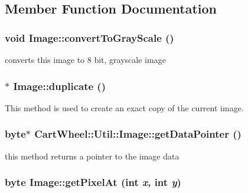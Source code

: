 \subsection{Member Function Documentation}
\hypertarget{classCartWheel_1_1Util_1_1Image_af17078f59a3a9f221ea0335d175a75c2}{
\subsubsection[{convertToGrayScale}]{\setlength{\rightskip}{0pt plus 5cm}void Image::convertToGrayScale ()}}
\label{classCartWheel_1_1Util_1_1Image_af17078f59a3a9f221ea0335d175a75c2}
converts this image to 8 bit, grayscale image \hypertarget{classCartWheel_1_1Util_1_1Image_a2e419982137bb49813bd644c726bbcaf}{
\subsubsection[{duplicate}]{ $\ast$ Image::duplicate ()}}
\label{classCartWheel_1_1Util_1_1Image_a2e419982137bb49813bd644c726bbcaf}
This method is used to create an exact copy of the current image. \hypertarget{classCartWheel_1_1Util_1_1Image_ac2269012d7dcf1b21cc8bbd1da7e6e13}{
\subsubsection[{getDataPointer}]{\setlength{\rightskip}{0pt plus 5cm}byte$\ast$ CartWheel::Util::Image::getDataPointer ()}}
\label{classCartWheel_1_1Util_1_1Image_ac2269012d7dcf1b21cc8bbd1da7e6e13}
this method returns a pointer to the image data \hypertarget{classCartWheel_1_1Util_1_1Image_a2586cc3cee4706b46c18e68cd5b77ced}{
\subsubsection[{getPixelAt}]{\setlength{\rightskip}{0pt plus 5cm}byte Image::getPixelAt (int {\em x}, \/  int {\em y})}}
